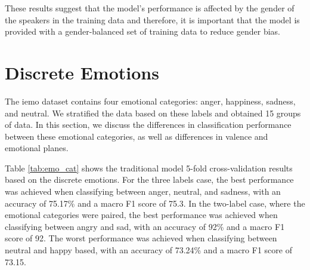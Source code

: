 These results suggest that the model's performance is affected by the gender of the speakers in the training data and therefore, it is important that the model is provided with a gender-balanced set of training data to reduce gender bias.

\section{Discrete Emotions}

The \ac{iemo} dataset contains four emotional categories: anger, happiness, sadness, and neutral. We stratified the data based on these labels and obtained 15 groups of data. In this section, we discuss the differences in classification performance between these emotional categories, as well as differences in valence and emotional planes.


Table \ref{tab:emo_cat} shows the traditional model 5-fold cross-validation results based on the discrete emotions. For the three labels case, the best performance was achieved when classifying between anger, neutral, and sadness, with an accuracy of 75.17\% and a macro F1 score of 75.3. In the two-label case, where the emotional categories were paired, the best performance was achieved when classifying between angry and sad, with an accuracy of 92\% and a macro F1 score of 92. The worst performance was achieved when classifying between neutral and happy based, with an accuracy of 73.24\% and a macro F1 score of 73.15.


